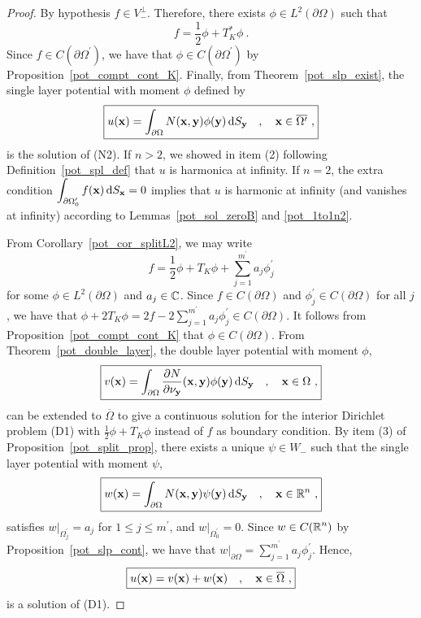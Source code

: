 \begin{proof}
By hypothesis $\displaystyle f \in V_-^\perp$.  Therefore, there exists
$\displaystyle \phi \in L^2(\partial \Omega)$ such that
\[
\boxed{
f = \frac{1}{2}\phi +T^\ast_K \phi \ .
}
\]
Since $\displaystyle f\in C(\partial \Omega^{\prime})$, we have that
$\displaystyle \phi \in C(\partial \Omega^{\prime})$ by
Proposition~\ref{pot_compt_cont_K}.
Finally, from Theorem~\ref{pot_slp_exist}, the single layer potential 
with moment $\phi$ defined by
\[
\boxed{
u(\mathbf{x}) = \int_{\partial \Omega} N(\mathbf{x},\mathbf{y})
\phi(\mathbf{y}) \,\mathrm{d}{S}_{\mathbf{y}} \quad , \quad \mathbf{x} \in \overline{\Omega^{\prime}}
\ ,
}
\]
is the solution of (N2).  If $n>2$, we showed in item (2) following
Definition~\ref{pot_spl_def} that $u$ is harmonica at infinity.  If
$n=2$, the extra condition
$\displaystyle \int_{\partial \Omega_0^{\prime}} f(\mathbf{x})\,\mathrm{d}{S}_{\mathbf{x}} = 0$ 
implies that $u$ is harmonic at infinity (and vanishes at infinity)
according to Lemmas~\ref{pot_sol_zeroB} and \ref{pot_1to1n2}.

 From Corollary~\ref{pot_cor_splitL2}, we may write
\[
\boxed{
f = \frac{1}{2} \phi + T_K \phi + \sum_{j=1}^{m^{\prime}} a_j \phi_j^{\prime}
}
\]
for some $\displaystyle \phi \in L^2(\partial \Omega)$ and $a_j \in \mathbb{C}$.
Since $f\in C(\partial \Omega)$ and
$\displaystyle \phi_j^{\prime} \in C(\partial \Omega)$
for all $j$, we have that
$\displaystyle
\phi + 2T_K \phi = 2f - 2 \sum_{j=1}^{m^{\prime}} a_j \phi_j^{\prime}
\in C(\partial \Omega)$.
It follows from Proposition~\ref{pot_compt_cont_K} that
$\phi \in C(\partial \Omega)$.  From Theorem~\ref{pot_double_layer},
the double layer potential with moment $\phi$,
\[
\boxed{
v(\mathbf{x}) = \int_{\partial \Omega}
\frac{\partial{N}}{\partial \mathbf{\nu}_{\mathbf{y}}}(\mathbf{x},\mathbf{y}) \phi(\mathbf{y})
\,\mathrm{d}{S}_{\mathbf{y}} \quad , \quad \mathbf{x} \in \Omega \ ,
}
\]
can be extended to $\overline{\Omega}$ to give a continuous solution for the
interior Dirichlet problem (D1) with 
$\displaystyle \frac{1}{2} \phi + T_K \phi$ instead of $f$ as boundary
condition.
By item (3) of Proposition~\ref{pot_split_prop}, there
exists a unique $\psi \in W_-$ such that the single layer potential
with moment $\psi$,
\[
\boxed{
w(\mathbf{x}) = \int_{\partial \Omega} N(\mathbf{x},\mathbf{y})
\psi(\mathbf{y}) \,\mathrm{d}{S}_{\mathbf{y}} \quad , \quad \mathbf{x} \in \mathbb{R}^n \ ,
}
\]
satisfies $\displaystyle w\big|_{\Omega_j^{\prime}} = a_j$ for
$\displaystyle 1\leq j \leq m^{\prime}$, and
$\displaystyle w\big|_{\Omega_0^{\prime}} = 0$.
Since $\displaystyle w \in C(\mathbb{R}^n)$ by
Proposition~\ref{pot_slp_cont}, we have that
$\displaystyle 
w\big|_{\partial \Omega} = \sum_{j=1}^{m^{\prime}} a_j \phi_j^{\prime}$.
Hence,
\[
\boxed{
u(\mathbf{x}) = v(\mathbf{x}) + w(\mathbf{x}) \quad , \quad \mathbf{x} \in
\overline{\Omega} \ ,
}
\]
is a solution of (D1).


\end{proof}
